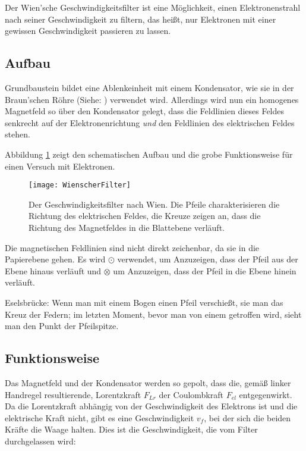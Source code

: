 Der Wien'sche Geschwindigkeitsfilter ist eine Möglichkeit, einen Elektronenstrahl nach seiner Geschwindigkeit zu filtern, das heißt, nur Elektronen mit einer gewissen Geschwindigkeit passieren zu lassen.

\subsection{Aufbau}


Grundbaustein bildet eine Ablenkeinheit mit einem Kondensator, wie sie in der Braun'schen Röhre (Siehe: ) verwendet wird. Allerdings wird nun ein homogenes Magnetfeld so über den Kondensator gelegt, dass die Feldlinien dieses Feldes senkrecht auf der Elektronenrichtung \emph{und} den Feldlinien des elektrischen Feldes stehen.

Abbildung \ref{fig:Wien} zeigt den schematischen Aufbau und die grobe Funktionsweise für einen Versuch mit Elektronen.

\begin{figure}[h!]
	\centering
	\vspace*{-10pt}
	\texttt{[image: WienscherFilter]}
	\caption{Der Geschwindigkeitsfilter nach Wien. Die Pfeile charakterisieren die Richtung des elektrischen Feldes, die Kreuze zeigen an, dass die Richtung des Magnetfeldes in die Blattebene verläuft.}
	\label{fig:Wien}
\end{figure}

\begin{Anmerkung}
	Die magnetischen Feldlinien sind nicht direkt zeichenbar, da sie \glqq in die Papierebene\grqq{} gehen. Es wird $\odot$ verwendet, um Anzuzeigen, dass der Pfeil aus der Ebene hinaus verläuft und $\otimes$ um Anzuzeigen, dass der Pfeil in die Ebene hinein verläuft.
	
	Eselsbrücke: Wenn man mit einem Bogen einen Pfeil verschießt, sie man das Kreuz der Federn; im letzten Moment, bevor man von einem getroffen wird, sieht man den Punkt der Pfeilspitze.
\end{Anmerkung}



\subsection{Funktionsweise}

Das Magnetfeld und der Kondensator werden so gepolt, dass die, gemäß linker Handregel resultierende, Lorentzkraft $F_{Lr}$ der Coulombkraft $F_{el}$ entgegenwirkt. Da die Lorentzkraft abhängig von der Geschwindigkeit des Elektrons ist und die elektrische Kraft nicht, gibt es eine Geschwindigkeit $v_f$, bei der sich die beiden Kräfte die Waage halten. Dies ist die Geschwindigkeit, die vom Filter durchgelassen wird:

